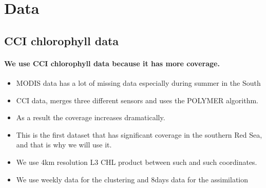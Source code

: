 \newcommand{\cov}{\text{cov}}

\newcommand{\0}{\mathbf{0}}

\newcommand{\C}{\mathbf{C}}
\newcommand{\X}{\mathbf{X}}
\newcommand{\U}{\mathbf{U}}
\renewcommand{\V}{\mathbf{V}}
\newcommand{\M}{\mathbf{M}}
\newcommand{\Q}{\mathbf{Q}}
\renewcommand{\H}{\mathbf{H}}
\newcommand{\I}{\mathbf{I}}
\newcommand{\R}{\mathbf{R}}
\renewcommand{\P}{\mathbf{P}}
\renewcommand{\L}{\mathbf{L}}

\renewcommand{\a}{\mathbf{a}}
\newcommand{\h}{\mathbf{h}}
\renewcommand{\r}{\mathbf{r}}
\newcommand{\x}{\mathbf{x}}
\renewcommand{\k}{\mathbf{k}}
\newcommand{\y}{\mathbf{y}}
\newcommand{\z}{\mathbf{z}}

\newcommand{\SSigma}{\mathbf{\Sigma}}
\newcommand{\GGamma}{\mathbf{\Gamma}}

\newcommand{\ttheta}{\boldsymbol\theta}
\newcommand{\eeta}{\boldsymbol\eta}
\newcommand{\vvarepsilon}{\boldsymbol\varepsilon}
\newcommand{\xxi}{\boldsymbol\xi}
\newcommand{\mmu}{\boldsymbol\mu}

\section{Data}

\subsection{CCI chlorophyll data}

\paragraph{We use CCI chlorophyll data because it has more coverage.}

\begin{itemize}
  \item MODIS data has a lot of missing data especially during summer
in the South
  \item CCI data, merges three different sensors and uses the POLYMER
algorithm.
  \item As a result the coverage increases dramatically.
  \item This is the first dataset that has significant coverage in
the southern Red Sea, and that is why we will use it.
  \item We use 4km resolution L3 CHL product between such and such
coordinates.
  \item We use weekly data for the clustering and 8days data for
the assimilation
\end{itemize}

